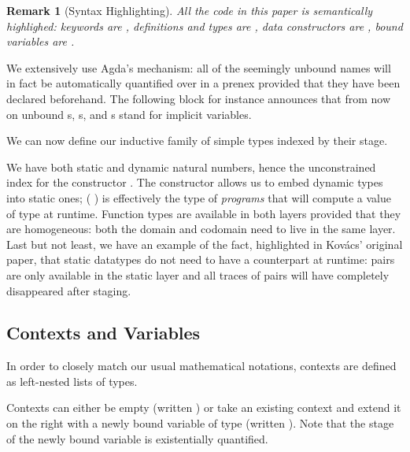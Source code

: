 \documentclass{article}
\newtheorem*{remark}{Remark}
\begin{document}

\begin{remark}[Syntax Highlighting]
  All the code in this paper is semantically highlighed:
  keywords are , definitions and types are ,
  data constructors are , bound variables are
  .
\end{remark}

We extensively use Agda's  mechanism: all of
the seemingly unbound names will in fact be automatically
quantified over in a prenex provided that they have been
declared beforehand.
%
The following block for instance announces that from now
on unbound s, s, and s stand for
implicit  variables.



We can now define our inductive family of simple types indexed
by their stage.


We have both static and dynamic natural numbers,
hence the unconstrained index  for the
constructor .
%
The constructor  allows us to embed dynamic
types into static ones; ( ) is effectively
the type of \emph{programs} that will compute a value of
type  at runtime.
%
Function types are available in both layers provided that
they are homogeneous: both the domain and codomain need
to live in the same layer.
%
Last but not least, we have an example of the fact,
highlighted in Kov{\'{a}}cs' original paper, that static
datatypes do not need to have a counterpart at runtime:
pairs are only available in the static layer and all traces
of pairs will have completely disappeared after staging.

\subsection{Contexts and Variables}

In order to closely match our usual mathematical notations,
contexts are defined as left-nested lists of types.


Contexts can either be empty (written )
or take an existing context  and extend it on the
right with a newly bound variable of type 
(written  \AIC{-,} ).
Note that the stage of the newly bound variable is
existentially quantified.
\end{document}
